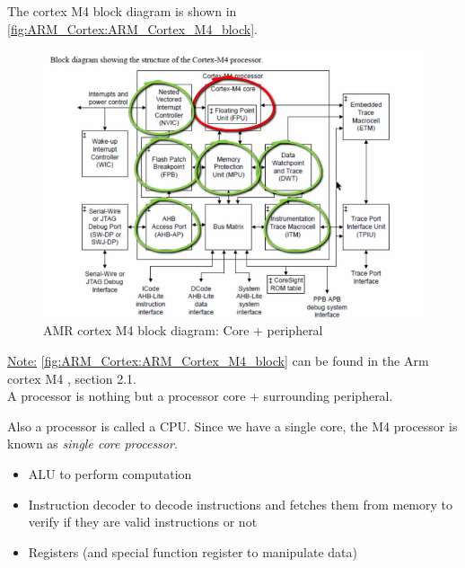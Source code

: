 The cortex M4 block diagram is shown in \autoref{fig:ARM_Cortex:ARM_Cortex_M4_block}.


\begin{figure}[h]
\centering
\includegraphics[scale=0.7]{Figures/ARM_Cortex/ARM_Cortex_M4_block}
\caption{AMR cortex M4 block diagram: Core + peripheral}
\label{fig:ARM_Cortex:ARM_Cortex_M4_block}
\end{figure}

\underline{Note:} \autoref{fig:ARM_Cortex:ARM_Cortex_M4_block} can be found in the Arm cortex M4 , section 2.1.\\

A processor is nothing but a processor core + surrounding peripheral.

Also a processor is called a CPU. Since we have a single core, the M4 processor is known as \textit{single core processor}.\\


\begin{itemize}
    \item ALU to perform computation 

    \item Instruction decoder to decode instructions and fetches them from memory to verify if they are valid instructions or not

    \item Registers (and special function register to manipulate data)
    
\end{itemize}


